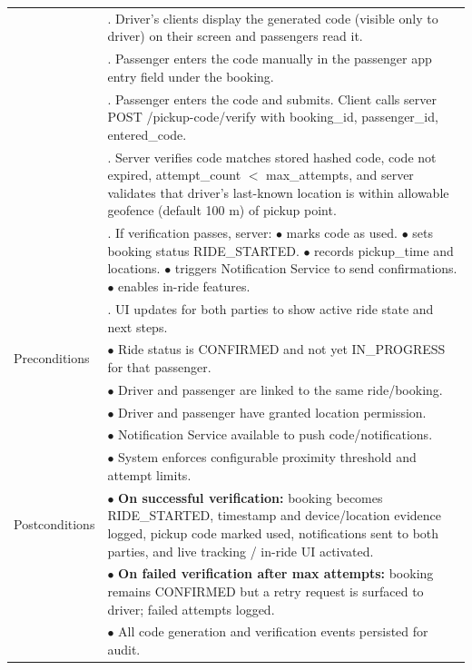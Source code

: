 \begin{longtable}{|>{\raggedright\arraybackslash}p{4cm}|>{\raggedright\arraybackslash}p{11cm}|}
& 4. Driver's clients display the generated code (visible only to driver) on their screen and passengers read it. \\
& 5. Passenger enters the code manually in the passenger app entry field under the booking. \\
& 6. Passenger enters the code and submits. Client calls server POST /pickup-code/verify with booking\_id, passenger\_id, entered\_code. \\
& 7. Server verifies code matches stored hashed code, code not expired, attempt\_count $<$ max\_attempts, and server validates that driver's last-known location is within allowable geofence (default 100 m) of pickup point. \\
& 8. If verification passes, server: \newline $\bullet$ marks code as used. \newline $\bullet$ sets booking status RIDE\_STARTED. \newline $\bullet$ records pickup\_time and locations. \newline $\bullet$ triggers Notification Service to send confirmations. \newline $\bullet$ enables in-ride features. \\
& 9. UI updates for both parties to show active ride state and next steps. \\
\hline
Preconditions & $\bullet$ Ride status is CONFIRMED and not yet IN\_PROGRESS for that passenger. \\
& $\bullet$ Driver and passenger are linked to the same ride/booking. \\
& $\bullet$ Driver and passenger have granted location permission. \\
& $\bullet$ Notification Service available to push code/notifications. \\
& $\bullet$ System enforces configurable proximity threshold and attempt limits. \\
\hline
Postconditions & $\bullet$ \textbf{On successful verification:} booking becomes RIDE\_STARTED, timestamp and device/location evidence logged, pickup code marked used, notifications sent to both parties, and live tracking / in-ride UI activated. \\
& $\bullet$ \textbf{On failed verification after max attempts:} booking remains CONFIRMED but a retry request is surfaced to driver; failed attempts logged. \\
& $\bullet$ All code generation and verification events persisted for audit. \\

\end{longtable}
